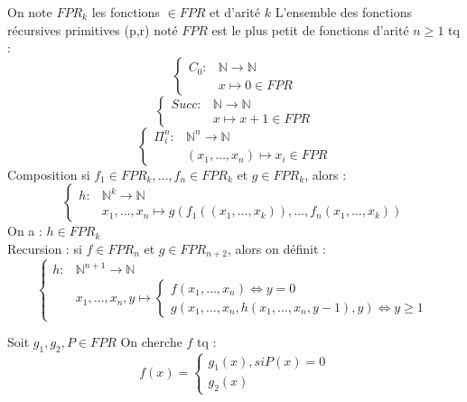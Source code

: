 \begin{definition}\label{def:}
    On note \(FPR_{k}\) les fonctions \( \in FPR\) et d'arité \(k\)   
    L'ensemble des fonctions récursives primitives (p,r) noté \(FPR\) est le plus petit de fonctions d'arité \(n \geq 1\) tq : 
    \[
        \begin{cases}
        C_0: &\mathbb{N} \to \mathbb{N} \\
        &x \mapsto 0 \in FPR
        \end{cases}
    \]
    \[
        \begin{cases}
        Succ : &\mathbb{N} \to \mathbb{N}\\
        &x \mapsto x+1 \in FPR
        \end{cases}
    \]
    \[
        \begin{cases}
        \Pi_{i}^{n} : &\mathbb{N}^{n} \to \mathbb{N}\\
        &(x_{1},\dots, x_{n}) \mapsto x_{i} \in FPR
        \end{cases}
    \]
    Composition si \(f_{1} \in FPR_{k}, \dots, f_{n} \in FPR_{k}\) et \(g \in FPR_{k}\), alors :\\ 
    \[
        \begin{cases}
        h : &\mathbb{N}^{k} \to \mathbb{N}\\
        &x_{1},\dots,x_{n} \mapsto g(f_{1}((x_{1},\dots,x_{k})), \dots, f_{n}(x_{1},\dots,x_{k}))
        \end{cases}
    \]
    On a : \(h \in FPR_{k}\)\\
    Recursion : si \(f \in FPR_{n}\) et \(g \in FPR_{n+2}\), alors on définit : \\
    \[
        \begin{cases}
        h : &\mathbb{N}^{n+1} \to \mathbb{N}\\
        &x_{1},\dots,x_{n},y \mapsto \begin{cases}
        f(x_{1},\dots,x_{n}) \iff y = 0 \\
        g(x_{1},\dots,x_{n}, h(x_{1},\dots,x_{n}, y-1),y) \iff  y \geq 1
        \end{cases}
        \end{cases}
    \] 
\end{definition}

\begin{corollary}[Condition]\label{col:}
    Soit \(g_{1}, g_{2},P \in FPR\) On cherche \(f\) tq :\\
    \[
        f(x) = \begin{cases}
        g_{1}(x), si P(x) = 0\\
        g_{2}(x)
        \end{cases}
    \]
\end{corollary}

